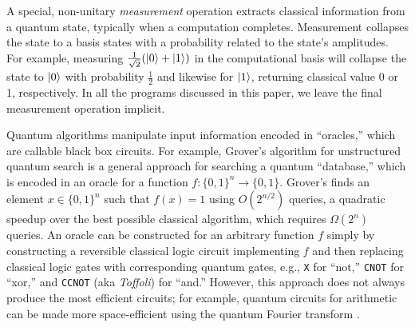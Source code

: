  A special, non-unitary \emph{measurement} operation extracts classical information from a quantum state, typically when a computation completes. Measurement collapses the state to a basis states with a probability related to the state's amplitudes. For example, measuring $\frac{1}{\sqrt{2}}(\left\vert{0}\right\rangle + \left\vert{1}\right\rangle)$ in the computational basis will collapse the state to $\left\vert{0}\right\rangle$ with probability $\frac{1}{2}$ and likewise for $\left\vert{1}\right\rangle$, returning classical value 0 or 1, respectively. In all the programs discussed in this paper, we leave the final measurement operation implicit.


Quantum algorithms manipulate input information encoded in ``oracles,'' which are callable black box circuits. For example, Grover's algorithm for unstructured quantum search \cite{grover1996,grover1997} is a general approach for searching a quantum ``database,''  which is encoded in an oracle for a function $f : \{0, 1\}^n \to \{0, 1\}$. Grover's finds an element $x \in \{0, 1\}^n$ such that $f(x) = 1$ using $O(2^{n/2})$ queries, a quadratic speedup over the best possible classical algorithm, which requires $\Omega(2^n)$ queries.
An oracle can be constructed for an arbitrary function $f$ simply by constructing a reversible classical logic circuit implementing $f$ and then replacing classical logic gates with corresponding quantum gates, e.g.,
\texttt{X} for ``not,'' \texttt{CNOT} for ``xor,'' and \texttt{CCNOT} (aka \emph{Toffoli}) for ``and.'' However, this approach does not always produce the most efficient circuits; for example, quantum circuits for arithmetic can be made more space-efficient using the quantum Fourier transform \cite{2000quant}.


